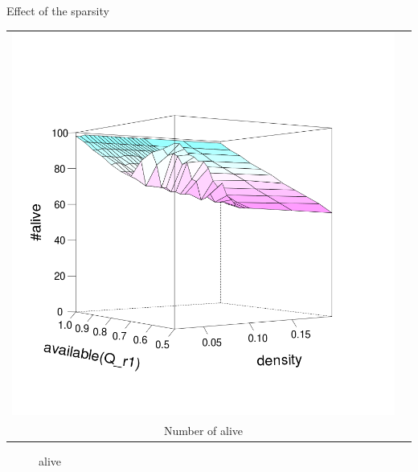 \documentclass[8pt, handout=show,notes=show]{beamer}
\begin{document}
\begin{frame}{Effect of the sparsity}
\begin{table}[H]
\begin{tabular}{cc}
 \includegraphics[width=\imgSize]{images/active_median}\\
 Number of alive
\end{tabular}

\end{table}

\begin{figure}
alive
\center
\end{figure}
\end{frame}

\renewcommand{\imgSize}{4cm}
\end{document}
